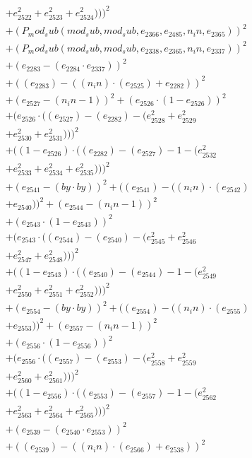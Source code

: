 \documentclass[10pt, a4paper]{article}
\begin{document}
\begin{align*}
& + e_{2522}^{2} + e_{2523}^{2} + e_{2524}^{2})))^{2} \\
& + (P_mod_sub(mod_sub, mod_sub, e_{2366}, e_{2485}, n_in, e_{2365}))^{2} \\
& + (P_mod_sub(mod_sub, mod_sub, e_{2338}, e_{2365}, n_in, e_{2337}))^{2} \\
& + (e_{2283} - (e_{2284}  \cdot  e_{2337}))^{2} \\
& + ((e_{2283}) - ((n_in)  \cdot  (e_{2525}) + e_{2282}))^{2} \\
& + (e_{2527} - (n_in - 1))^{2} + (e_{2526}  \cdot  (1 - e_{2526}))^{2} \\
& + (e_{2526}  \cdot  ((e_{2527}) - (e_{2282}) - (e_{2528}^{2} + e_{2529}^{2} \\
& + e_{2530}^{2} + e_{2531}^{2})))^{2} \\
& + ((1 - e_{2526})  \cdot  ((e_{2282}) - (e_{2527}) - 1 - (e_{2532}^{2} \\
& + e_{2533}^{2} + e_{2534}^{2} + e_{2535}^{2})))^{2} \\
& + (e_{2541} - (by  \cdot  by))^{2} + ((e_{2541}) - ((n_in)  \cdot  (e_{2542}) \\
& + e_{2540}))^{2} + (e_{2544} - (n_in - 1))^{2} \\
& + (e_{2543}  \cdot  (1 - e_{2543}))^{2} \\
& + (e_{2543}  \cdot  ((e_{2544}) - (e_{2540}) - (e_{2545}^{2} + e_{2546}^{2} \\
& + e_{2547}^{2} + e_{2548}^{2})))^{2} \\
& + ((1 - e_{2543})  \cdot  ((e_{2540}) - (e_{2544}) - 1 - (e_{2549}^{2} \\
& + e_{2550}^{2} + e_{2551}^{2} + e_{2552}^{2})))^{2} \\
& + (e_{2554} - (by  \cdot  by))^{2} + ((e_{2554}) - ((n_in)  \cdot  (e_{2555}) \\
& + e_{2553}))^{2} + (e_{2557} - (n_in - 1))^{2} \\
& + (e_{2556}  \cdot  (1 - e_{2556}))^{2} \\
& + (e_{2556}  \cdot  ((e_{2557}) - (e_{2553}) - (e_{2558}^{2} + e_{2559}^{2} \\
& + e_{2560}^{2} + e_{2561}^{2})))^{2} \\
& + ((1 - e_{2556})  \cdot  ((e_{2553}) - (e_{2557}) - 1 - (e_{2562}^{2} \\
& + e_{2563}^{2} + e_{2564}^{2} + e_{2565}^{2})))^{2} \\
& + (e_{2539} - (e_{2540}  \cdot  e_{2553}))^{2} \\
& + ((e_{2539}) - ((n_in)  \cdot  (e_{2566}) + e_{2538}))^{2} \\

\end{align*}
\end{document}
